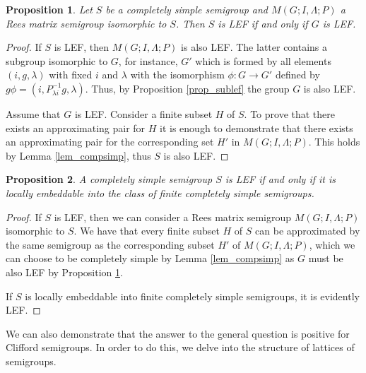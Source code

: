 \documentclass{article}
\newtheorem{proposition}{Proposition}
\theoremstyle{definition}
\begin{document}
\begin{proposition}\label{prop_compsimp1}
Let $S$ be a completely simple semigroup and $M(G; I, \Lambda; P)$ a Rees matrix semigroup isomorphic to $S$. Then $S$ is LEF if and only if $G$ is LEF.
\end{proposition}
\begin{proof}
If $S$ is LEF, then  $M(G; I, \Lambda; P)$ is also LEF. The latter contains a subgroup isomorphic to $G$, for instance, $G'$ which is formed by all elements $(i,g,\lambda)$ with fixed $i$ and $\lambda$ with the isomorphism $\phi: G \rightarrow G'$ defined by $g \phi = (i, P_{\lambda i}^{-1} g, \lambda)$. Thus, by Proposition \ref{prop_sublef} the group $G$ is also LEF.

Assume that $G$ is LEF. Consider a finite subset $H$ of $S$. To prove that there exists an approximating pair for $H$ it is enough to demonstrate that there exists an approximating pair for the corresponding set $H'$ in $M(G; I, \Lambda; P)$. This holds by Lemma \ref{lem_compsimp}, thus $S$ is also LEF.
\end{proof}

\begin{proposition}
A completely simple semigroup $S$ is LEF if and only if it is locally embeddable into the class of finite completely simple semigroups. 
\end{proposition}
\begin{proof}
If $S$ is LEF, then we can consider a Rees matrix semigroup $M(G; I, \Lambda; P)$ isomorphic to $S$. We have that every finite subset $H$ of $S$ can be approximated by the same semigroup as the corresponding subset $H'$ of $M(G; I, \Lambda; P)$, which we can choose to be completely simple by Lemma \ref{lem_compsimp} as $G$ must be also LEF by Proposition \ref{prop_compsimp1}.

If $S$ is  locally embeddable into finite completely simple semigroups, it is evidently LEF.
\end{proof}

We can also demonstrate that the answer to the general question is positive for Clifford semigroups. In order to do this, we delve into the structure of lattices of semigroups.
\end{document}
